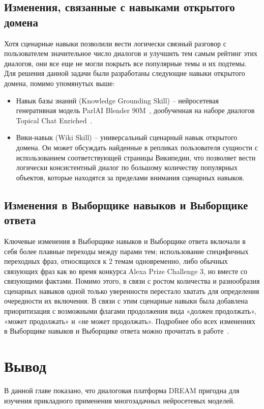 \subsection{Изменения, связанные с навыками открытого домена}

Хотя сценарные навыки позволили вести логически связный разговор с пользователем значительное число диалогов и улучшить тем самым рейтинг этих диалогов, они все еще не могли покрыть все популярные темы и их подтемы. Для решения данной задачи были разработаны следующие навыки открытого домена, помимо упомянутых выше:
\begin{itemize}
\item Навык базы знаний (Knowledge Grounding Skill) -- нейросетевая генеративная модель ParlAI Blender 90M~\cite{roller_other_2020}, дообученная на наборе диалогов Topical Chat Enriched~\cite{hedayatnia_2020}.
\item Вики-навык (Wiki Skill) -- универсальный сценарный навык открытого домена. Он может обсуждать найденные в репликах пользователя сущности с использованием соответствующей страницы Википедии, что позволяет вести логически консистентный диалог по большому количеству популярных объектов, которые находятся за пределами внимания сценарных навыков.
\end{itemize}
\subsection{Изменения в Выборщике навыков и Выборщике ответа}

Ключевые изменения в Выборщике навыков и Выборщике ответа включали в себя более плавные переходы между парами тем; использование специфичных переходных фраз, относящихся к 2 темам одновременно, либо обычных связующих фраз как во время конкурса Alexa Prize Challenge 3, но вместе со связующими фактами.
Помимо этого, в связи с ростом количества и разнообразия сценарных навыков одной только уверенности перестало хватать для определения очередности их включения. В связи с этим сценарные навыки была добавлена приоритизация с возможными флагами продолжения вида «должен продолжать», «может продолжать» и «не может продолжать».
Подробнее обо всех изменениях в Выборщике навыков и Выборщике ответа можно прочитать в работе~\cite{dream2}.

\section{Вывод}

В данной главе показано, что {диалоговая платформа DREAM пригодна для изучения прикладного применения многозадачных нейросетевых моделей.}